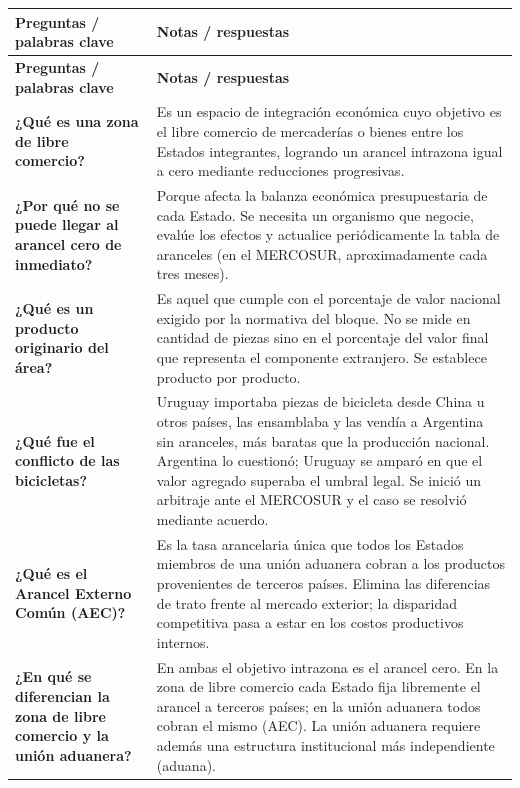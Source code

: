 \documentclass[12pt,oneside]{book}
\begin{document}
\begin{longtable}{>{\raggedright\arraybackslash}p{} >{\raggedright\arraybackslash}p{}}
\toprule
\textbf{Preguntas / palabras clave} & \textbf{Notas / respuestas} \\
\midrule
\endfirsthead
\toprule
\textbf{Preguntas / palabras clave} & \textbf{Notas / respuestas} \\
\midrule
\endhead
\bottomrule
\endfoot

\textbf{¿Qué es una zona de libre comercio?} &
Es un espacio de integración económica cuyo objetivo es el libre comercio de mercaderías o bienes entre los Estados integrantes, logrando un arancel intrazona igual a cero mediante reducciones progresivas. \\[0.8em]

\textbf{¿Por qué no se puede llegar al arancel cero de inmediato?} &
Porque afecta la balanza económica presupuestaria de cada Estado. Se necesita un organismo que negocie, evalúe los efectos y actualice periódicamente la tabla de aranceles (en el MERCOSUR, aproximadamente cada tres meses). \\[0.8em]

\textbf{¿Qué es un producto originario del área?} &
Es aquel que cumple con el porcentaje de valor nacional exigido por la normativa del bloque. No se mide en cantidad de piezas sino en el porcentaje del valor final que representa el componente extranjero. Se establece producto por producto. \\[0.8em]

\textbf{¿Qué fue el conflicto de las bicicletas?} &
Uruguay importaba piezas de bicicleta desde China u otros países, las ensamblaba y las vendía a Argentina sin aranceles, más baratas que la producción nacional. Argentina lo cuestionó; Uruguay se amparó en que el valor agregado superaba el umbral legal. Se inició un arbitraje ante el MERCOSUR y el caso se resolvió mediante acuerdo. \\[0.8em]

\textbf{¿Qué es el Arancel Externo Común (AEC)?} &
Es la tasa arancelaria única que todos los Estados miembros de una unión aduanera cobran a los productos provenientes de terceros países. Elimina las diferencias de trato frente al mercado exterior; la disparidad competitiva pasa a estar en los costos productivos internos. \\[0.8em]

\textbf{¿En qué se diferencian la zona de libre comercio y la unión aduanera?} &
En ambas el objetivo intrazona es el arancel cero. En la zona de libre comercio cada Estado fija libremente el arancel a terceros países; en la unión aduanera todos cobran el mismo (AEC). La unión aduanera requiere además una estructura institucional más independiente (aduana). \\[0.8em]


\end{longtable}
\end{document}
